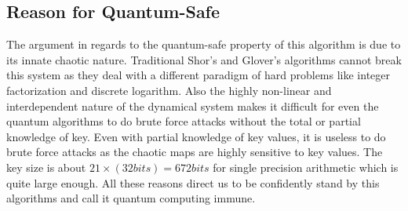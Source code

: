 \subsection{Reason for Quantum-Safe}
The argument in regards to the quantum-safe property of this algorithm is due to its innate chaotic nature. Traditional Shor's and Glover's algorithms cannot break this system as they deal with a different paradigm of hard problems like integer factorization and discrete logarithm. Also the highly non-linear and interdependent nature of the dynamical system makes it difficult for even the quantum algorithms to do brute force attacks without the total or partial knowledge of key. Even with partial knowledge of key values, it is useless to do brute force attacks as the chaotic maps are highly sensitive to key values. The key size is about $21\times(32 bits) = 672 bits$ for single precision arithmetic which is quite large enough. All these reasons direct us to be confidently stand by this algorithms and call it quantum computing immune. 
